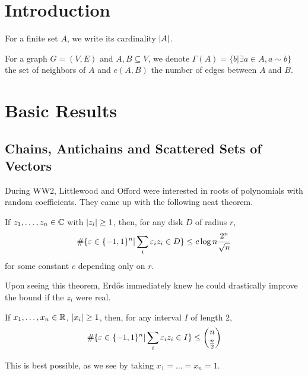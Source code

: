 \documentclass{article}
\begin{document}
\maketitle

\tableofcontents

\clearpage

\setcounter{section}{-1}
\section{Introduction}

For a finite set $A$, we write its cardinality $\left\lvert A\right\rvert$.

For a graph $G = (V, E)$ and $A, B \subseteq V$, we denote $\Gamma(A) = \{b | \exists a \in A, a \sim b\}$ the set of neighbors of $A$ and $e(A, B)$ the number of edges between $A$ and $B$.

\clearpage

\section{Basic Results}

\subsection{Chains, Antichains and Scattered Sets of Vectors}

\newlec

During WW2, Littlewood and Offord were interested in roots of polynomials with random coefficients. They came up with the following neat theorem.

\begin{thm}
  If $z_1, \dots, z_n \in \mathbb C$ with $\left\lvert z_i\right\rvert \ge 1$, then, for any disk $D$ of radius $r$,
  $$\#\{\varepsilon \in \{-1, 1\}^n | \sum_i \varepsilon_i z_i \in D\} \le c \log n \frac{2^n}{\sqrt n}$$
  for some constant $c$ depending only on $r$.
\end{thm}

Upon seeing this theorem, Erd\H os immediately knew he could drastically improve the bound if the $z_i$ were real.

\begin{thm}[Erd\H os, 1945]
  If $x_1, \dots, x_n \in \mathbb R$, $\left\lvert x_i\right\rvert \ge 1$, then, for any interval $I$ of length $2$,
  $$\#\{\varepsilon \in \{-1, 1\}^n | \sum_i \varepsilon_i z_i \in I\} \le \binom n{\frac n 2}$$
\end{thm}

This is best possible, as we see by taking $x_1 = \dots = x_n = 1$.
\end{document}
